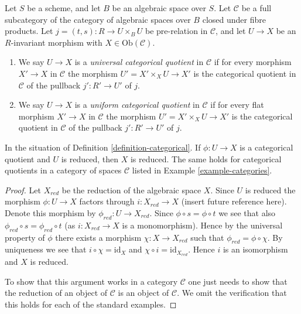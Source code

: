 \begin{definition}
\label{definition-universal-categorical}
Let $S$ be a scheme, and let $B$ be an algebraic space over $S$.
Let $\mathcal{C}$ be a full subcategory of the category of algebraic
spaces over $B$ closed under fibre products.
Let $j = (t, s) : R \to U \times_B U$ be pre-relation in
$\mathcal{C}$, and let $U \to X$ be an $R$-invariant morphism with
$X \in \text{Ob}(\mathcal{C})$.
\begin{enumerate}
\item We say $U \to X$ is a {\it universal categorical quotient}
in $\mathcal{C}$ if for every morphism $X' \to X$ in $\mathcal{C}$
the morphism $U' = X' \times_X U \to X'$ is the categorical quotient in
$\mathcal{C}$ of the pullback $j' : R' \to U'$ of $j$.
\item We say $U \to X$ is a {\it uniform categorical quotient}
in $\mathcal{C}$ if for every flat morphism $X' \to X$ in $\mathcal{C}$
the morphism $U' = X' \times_X U \to X'$ is the categorical quotient in
$\mathcal{C}$ of the pullback $j' : R' \to U'$ of $j$.
\end{enumerate}
\end{definition}

\begin{lemma}
\label{lemma-categorical-reduced}
In the situation of
Definition \ref{definition-categorical}.
If $\phi : U \to X$ is a categorical quotient and $U$ is reduced,
then $X$ is reduced. The same holds for categorical quotients in
a category of spaces $\mathcal{C}$ listed in
Example \ref{example-categories}.
\end{lemma}

\begin{proof}
Let $X_{red}$ be the reduction of the algebraic space $X$.
Since $U$ is reduced the morphism $\phi : U \to X$ factors through
$i : X_{red} \to X$ (insert future reference here). Denote this morphism
by $\phi_{red} : U \to X_{red}$. Since $\phi \circ s = \phi \circ t$ we
see that also $\phi_{red} \circ s = \phi_{red} \circ t$ (as
$i : X_{red} \to X$ is a monomorphism). Hence by the universal property
of $\phi$ there exists a morphism $\chi : X \to X_{red}$ such that
$\phi_{red} = \phi \circ \chi$. By uniqueness we see that
$i \circ \chi = \text{id}_X$ and $\chi \circ i = \text{id}_{X_{red}}$.
Hence $i$ is an isomorphism and $X$ is reduced.

\medskip\noindent
To show that this argument works in a category $\mathcal{C}$ one
just needs to show that the reduction of an object of $\mathcal{C}$
is an object of $\mathcal{C}$. We omit the verification that this
holds for each of the standard examples.
\end{proof}





